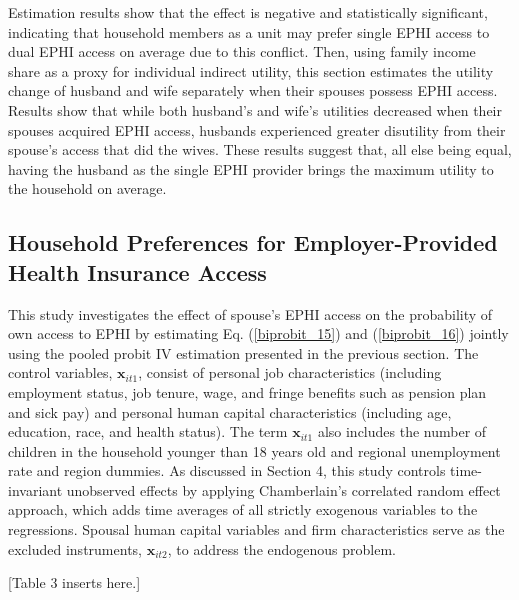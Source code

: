 \documentclass[legno,11pt]{article}
\begin{document}
Estimation results show that the effect is negative and
statistically significant, indicating that household members as a
unit may prefer single EPHI access to dual EPHI access on average
due to this conflict. Then, using family income share as a proxy for
individual indirect utility, this section estimates the utility
change of husband and wife separately when their spouses possess
EPHI access. Results show that while both husband's and wife's
utilities decreased when their spouses acquired EPHI access,
husbands experienced greater disutility from their spouse's access
that did the wives. These results suggest that, all else being
equal, having the husband as the single EPHI provider brings the
maximum utility to the household on average.

\subsection{Household Preferences for Employer-Provided Health Insurance Access}
This study investigates the effect of spouse's EPHI access on the
probability of own access to EPHI by estimating Eq.
(\ref{biprobit_15}) and (\ref{biprobit_16}) jointly using the pooled
probit IV estimation presented in the previous section. The control
variables, $\textbf{x}_{it1}$, consist of personal job
characteristics (including employment status, job tenure, wage, and
fringe benefits such as pension plan and sick pay) and personal
human capital characteristics (including age, education, race, and
health status). The term $\textbf{x}_{it1}$ also includes the number
of children in the household younger than 18 years old and regional
unemployment rate and region dummies. As discussed in Section 4,
this study controls time-invariant unobserved effects by applying
Chamberlain's correlated random effect approach, which adds time
averages of all strictly exogenous variables to the regressions.
Spousal human capital variables and firm characteristics serve as
the excluded instruments, $\textbf{x}_{it2}$, to address the
endogenous problem.
\par

\begin{center}
[Table 3 inserts here.]
\end{center}
\end{document}
